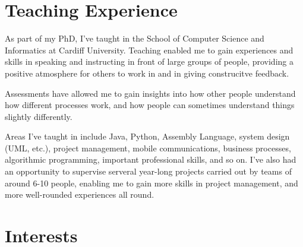 \documentclass[11pt,a4paper,sans]{moderncv} %
\begin{document}
\section{Teaching Experience}
As part of my PhD, I've taught in the School of Computer Science and Informatics at Cardiff University. Teaching enabled me to gain experiences and skills in speaking and instructing in front of large groups of people, providing a positive atmosphere for others to work in and in giving construcitve feedback.

Assessments have allowed me to gain insights into how other people understand how different processes work, and how people can sometimes understand things slightly differently.

Areas I've taught in include Java, Python, Assembly Language, system design (UML, etc.), project management, mobile communications, business processes, algorithmic programming, important professional skills, and so on. I've also had an opportunity to supervise serveral year-long projects carried out by teams of around 6-10 people, enabling me to gain more skills in project management, and more well-rounded experiences all round.


\section{Interests}

\renewcommand{\listitemsymbol}{-~} %

\end{document}
